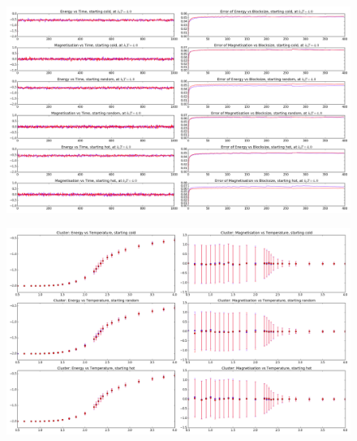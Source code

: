 \begin{frame}
	\begin{figure}
		\centering
		\includegraphics[width=1.0\textwidth]{Images/C4}
	\end{figure}
\end{frame}
\begin{frame}
\begin{figure}
	\centering
	\includegraphics[width=1.0\textwidth]{Images/CT}
\end{figure}
\end{frame}






%
%
%

